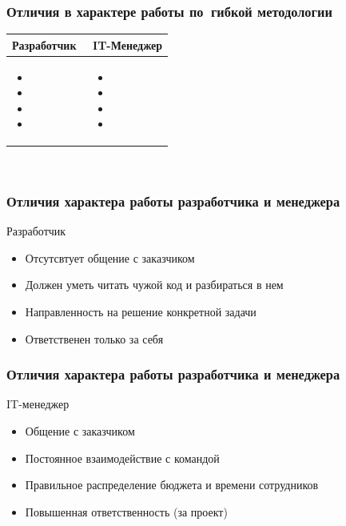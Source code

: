 \documentclass{../industrial-development}
\begin{document}
\begin{frame} \frametitle{Отличия в характере работы по~гибкой методологии}

	 	\begin{table}[R]

\begin{center}
\begin{tabular}{|p{0.5\linewidth}|p{0.5\linewidth}|}
\hline
\textbf{Разработчик} & \textbf{IT-Менеджер} \\
\hline
\begin{itemize}
\item 
\item 
\item 
\item 
\end{itemize}
 & 
\begin{itemize}
\item 
\item 
\item
\item
\end{itemize} \\
\hline
\end{tabular}
\end{center}
\end{table} 
\end{frame}
\lecturenotes
~\cite{How_to_be_a_good_IT-manager}


\begin{frame} \frametitle{Отличия характера работы разработчика и менеджера}
	\begin{block}{Разработчик}
\begin{itemize}
\item Отсутсвтует общение с заказчиком
\item Должен уметь читать чужой код и разбираться в нем
\item Направленность на решение конкретной задачи
\item Ответственен только за себя
\end{itemize}
\end{block}
\end{frame}
\lecturenotes

\begin{frame} \frametitle{Отличия характера работы разработчика и менеджера}
	\begin{block}{IT-менеджер}
\begin{itemize}
\item Общение с заказчиком
\item Постоянное взаимодействие с командой
\item Правильное распределение бюджета и времени сотрудников
\item Повышенная ответственность (за проект)
\end{itemize}
\end{block}
\end{frame}
\lecturenotes
\end{document}
